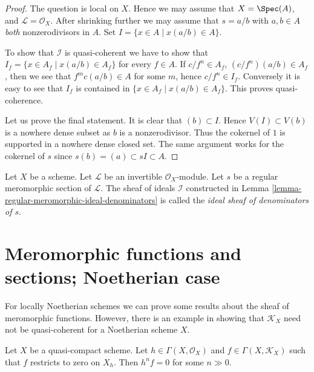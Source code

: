 \begin{proof}
The question is local on $X$.
Hence we may assume that $X = \Spec(A)$,
and $\mathcal{L} = \mathcal{O}_X$. After shrinking further
we may assume that $s = a/b$ with $a, b \in A$ {\it both}
nonzerodivisors in $A$. Set $I = \{x \in A \mid x(a/b) \in A\}$.

\medskip\noindent
To show that $\mathcal{I}$ is quasi-coherent we have to show
that $I_f = \{x \in A_f \mid x(a/b) \in A_f\}$ for every
$f \in A$. If $c/f^n \in A_f$, $(c/f^n)(a/b) \in A_f$, then we see
that $f^mc(a/b) \in A$ for some $m$, hence $c/f^n \in I_f$.
Conversely it is easy to see that $I_f$ is contained in
$\{x \in A_f \mid x(a/b) \in A_f\}$. This proves quasi-coherence.

\medskip\noindent
Let us prove the final statement. It is clear that $(b) \subset I$.
Hence $V(I) \subset V(b)$ is a nowhere dense subset as $b$ is
a nonzerodivisor. Thus the cokernel of $1$ is supported in a nowhere
dense closed set. The same argument works for the cokernel
of $s$ since $s(b) = (a) \subset sI \subset A$.
\end{proof}

\begin{definition}
\label{definition-regular-meromorphic-ideal-denominators}
Let $X$ be a scheme.
Let $\mathcal{L}$ be an invertible $\mathcal{O}_X$-module.
Let $s$ be a regular meromorphic section of $\mathcal{L}$.
The sheaf of ideals $\mathcal{I}$ constructed in
Lemma \ref{lemma-regular-meromorphic-ideal-denominators}
is called the {\it ideal sheaf of denominators of $s$}.
\end{definition}




\section{Meromorphic functions and sections; Noetherian case}
\label{section-meromorphic-noetherian}

\noindent
For locally Noetherian schemes we can prove some results about the
sheaf of meromorphic functions. However, there is an example in
\cite{misconceptions} showing that $\mathcal{K}_X$ need not be quasi-coherent
for a Noetherian scheme $X$.

\begin{lemma}
\label{lemma-meromorphic-section-restricts-to-zero}
Let $X$ be a quasi-compact scheme. Let $h \in \Gamma(X, \mathcal{O}_X)$ and
$f \in \Gamma(X, \mathcal{K}_X)$ such that $f$ restricts
to zero on $X_h$. Then $h^n f = 0$ for some $n \gg 0$.
\end{lemma}

